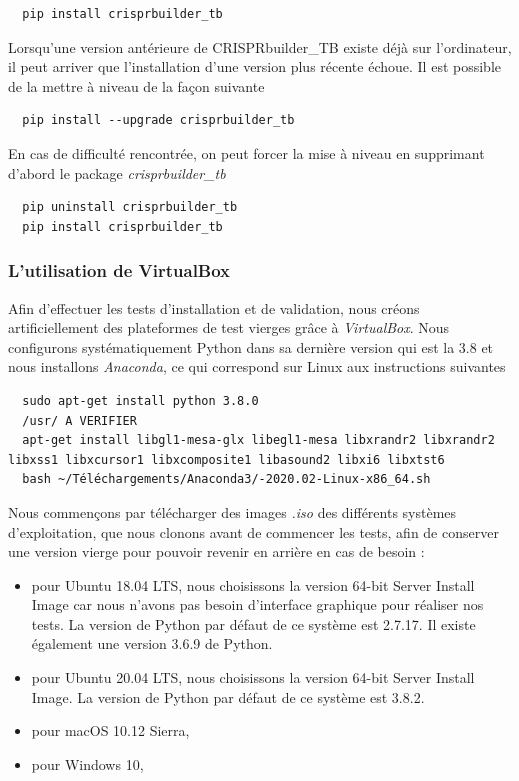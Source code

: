 \documentclass[twoside,a4paper,11pt,frenchb,openany]{report}
\begin{document}
\begin{verbatim}
  pip install crisprbuilder_tb
\end{verbatim}

Lorsqu'une version antérieure de CRISPRbuilder\_TB existe déjà sur l'ordinateur, il peut arriver que l'installation d'une version plus récente échoue. Il est possible de la mettre à niveau de la façon suivante
\begin{verbatim}
  pip install --upgrade crisprbuilder_tb
\end{verbatim}

En cas de difficulté rencontrée, on peut forcer la mise à niveau en supprimant d'abord le package \textit{crisprbuilder\_tb}
\begin{verbatim}
  pip uninstall crisprbuilder_tb
  pip install crisprbuilder_tb
\end{verbatim}





\subsubsection{L'utilisation de VirtualBox}

Afin d'effectuer les tests d'installation et de validation, nous créons artificiellement des plateformes de test vierges grâce à \textit{VirtualBox}. Nous configurons systématiquement Python dans sa dernière version qui est la 3.8 et nous installons \textit{Anaconda}, ce qui correspond sur Linux aux instructions suivantes

\begin{verbatim}
  sudo apt-get install python 3.8.0
  /usr/ A VERIFIER
  apt-get install libgl1-mesa-glx libegl1-mesa libxrandr2 libxrandr2 libxss1 libxcursor1 libxcomposite1 libasound2 libxi6 libxtst6
  bash ~/Téléchargements/Anaconda3/-2020.02-Linux-x86_64.sh

\end{verbatim}

Nous commençons par télécharger des images \textit{.iso} des différents systèmes d'exploitation, que nous clonons avant de commencer les tests, afin de conserver une version vierge pour pouvoir revenir en arrière en cas de besoin :
\begin{itemize}
\item pour Ubuntu 18.04 LTS, nous choisissons la version 64-bit Server Install Image car nous n'avons pas besoin d'interface graphique pour réaliser nos tests. La version de Python par défaut de ce système est 2.7.17. Il existe également une version 3.6.9 de Python.
\item pour Ubuntu 20.04 LTS, nous choisissons la version 64-bit Server Install Image. La version de Python par défaut de ce système est 3.8.2.
\item pour macOS 10.12 Sierra, 
\item pour Windows 10, 
\end{itemize}
\end{document}
